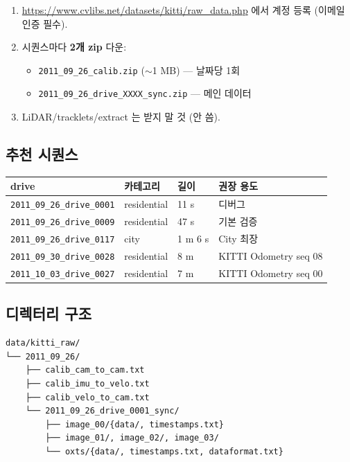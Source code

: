 \documentclass[11pt,a4paper,oneside]{report}
\begin{document}
\begin{enumerate}
\item \url{https://www.cvlibs.net/datasets/kitti/raw_data.php} 에서 계정 등록 (이메일 인증 필수).
\item 시퀀스마다 \textbf{2개 zip} 다운:
  \begin{itemize}
  \item \texttt{2011\_09\_26\_calib.zip} (\(\sim\)1 MB) — 날짜당 1회
  \item \texttt{2011\_09\_26\_drive\_XXXX\_sync.zip} — 메인 데이터
  \end{itemize}
\item LiDAR/tracklets/extract 는 받지 말 것 (안 씀).
\end{enumerate}

\subsection{추천 시퀀스}

\begin{center}\small
\begin{tabular}{llll}
\toprule
drive & 카테고리 & 길이 & 권장 용도 \\
\midrule
\texttt{2011\_09\_26\_drive\_0001} & residential & 11 s & 디버그 \\
\texttt{2011\_09\_26\_drive\_0009} & residential & 47 s & 기본 검증 \\
\texttt{2011\_09\_26\_drive\_0117} & city & 1 m 6 s & City 최장 \\
\texttt{2011\_09\_30\_drive\_0028} & residential & 8 m & KITTI Odometry seq 08 \\
\texttt{2011\_10\_03\_drive\_0027} & residential & 7 m & KITTI Odometry seq 00 \\
\bottomrule
\end{tabular}
\end{center}

\subsection{디렉터리 구조}

\begin{lstlisting}[style=shell]
data/kitti_raw/
└── 2011_09_26/
    ├── calib_cam_to_cam.txt
    ├── calib_imu_to_velo.txt
    ├── calib_velo_to_cam.txt
    └── 2011_09_26_drive_0001_sync/
        ├── image_00/{data/, timestamps.txt}
        ├── image_01/, image_02/, image_03/
        └── oxts/{data/, timestamps.txt, dataformat.txt}
\end{lstlisting}
\end{document}
